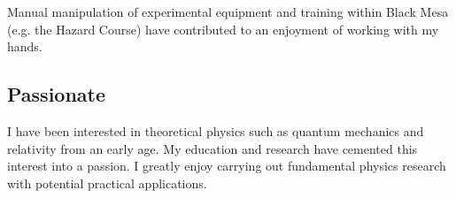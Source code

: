 \documentclass[
	10pt, %
]{FreemanCV}
\begin{document}
\begin{paracol}{2}
Manual manipulation of experimental equipment and training within Black Mesa (e.g. the Hazard Course) have contributed to an enjoyment of working with my hands.

\subsection{Passionate}

I have been interested in theoretical physics such as quantum mechanics and relativity from an early age. My education and research have cemented this interest into a passion. I greatly enjoy carrying out fundamental physics research with potential practical applications.



\end{paracol} %

\end{document}
